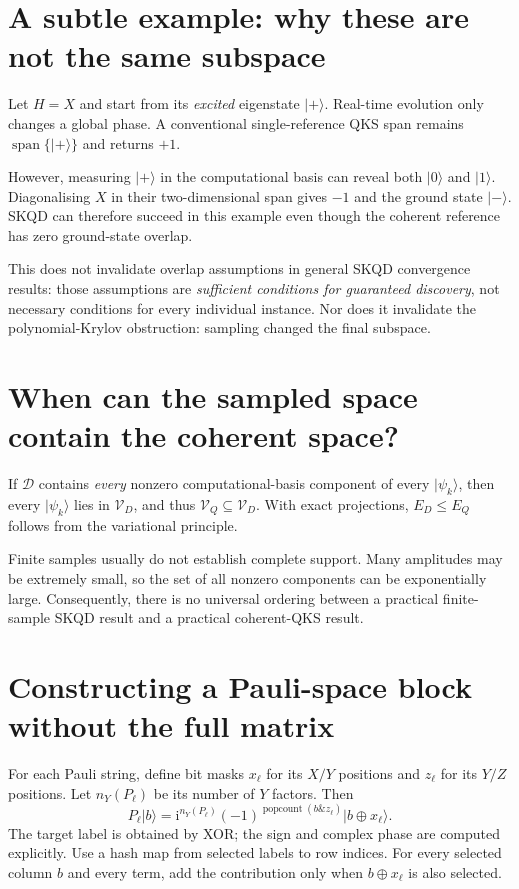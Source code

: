 \documentclass[11pt,a4paper,oneside]{report}
\newcommand{\ket}[1]{\lvert #1\rangle}
\newcommand{\Dset}{\mathcal D}
\newcommand{\I}{\mathrm i}
\begin{document}
\section{A subtle example: why these are not the same subspace}
Let $H=X$ and start from its \emph{excited} eigenstate $\ket+$. Real-time evolution only changes a global phase. A conventional single-reference QKS span remains $\operatorname{span}\{\ket+\}$ and returns $+1$.

However, measuring $\ket+$ in the computational basis can reveal both $\ket0$ and $\ket1$. Diagonalising $X$ in their two-dimensional span gives $-1$ and the ground state $\ket-$. SKQD can therefore succeed in this example even though the coherent reference has zero ground-state overlap.

This does not invalidate overlap assumptions in general SKQD convergence results: those assumptions are \emph{sufficient conditions for guaranteed discovery}, not necessary conditions for every individual instance. Nor does it invalidate the polynomial-Krylov obstruction: sampling changed the final subspace.

\section{When can the sampled space contain the coherent space?}
If $\Dset$ contains \emph{every} nonzero computational-basis component of every $\ket{\psi_k}$, then every $\ket{\psi_k}$ lies in $\mathcal V_D$, and thus $\mathcal V_Q\subseteq\mathcal V_D$. With exact projections, $E_D\le E_Q$ follows from the variational principle.

Finite samples usually do not establish complete support. Many amplitudes may be extremely small, so the set of all nonzero components can be exponentially large. Consequently, there is no universal ordering between a practical finite-sample SKQD result and a practical coherent-QKS result.

\section{Constructing a Pauli-space block without the full matrix}
For each Pauli string, define bit masks $x_\ell$ for its $X/Y$ positions and $z_\ell$ for its $Y/Z$ positions. Let $n_Y(P_\ell)$ be its number of $Y$ factors. Then
\begin{equation}\label{eq:pauliaction}
P_\ell\ket b=\I^{n_Y(P_\ell)}(-1)^{\operatorname{popcount}(b\mathbin{\&}z_\ell)}\ket{b\oplus x_\ell}.
\end{equation}
The target label is obtained by XOR; the sign and complex phase are computed explicitly. Use a hash map from selected labels to row indices. For every selected column $b$ and every term, add the contribution only when $b\oplus x_\ell$ is also selected.
\end{document}
